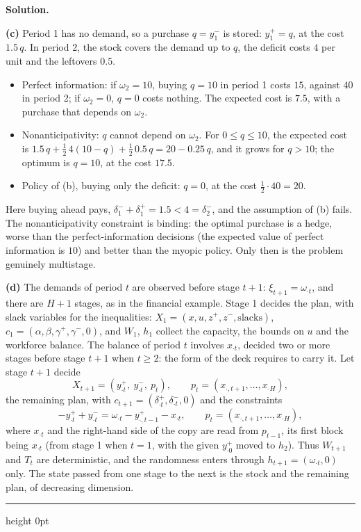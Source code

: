 \documentclass[11pt]{article}
\newenvironment{solution}
    {\par\nobreak\smallskip\noindent\textbf{Solution.}\par\nobreak\smallskip}
    {\par\medskip\hrule height 0pt\medskip}
\begin{document}
\begin{solution}
\textbf{(c)} Period 1 has no demand, so a purchase $q = y_1^-$ is stored:
$y_1^+ = q$, at the cost $1.5\,q$. In period 2, the stock covers the demand up to $q$,
the deficit costs $4$ per unit and the leftovers $0.5$.
\begin{itemize}
\item Perfect information: if $\omega_2 = 10$, buying $q = 10$ in period 1 costs
$15$, against $40$ in period 2; if $\omega_2 = 0$, $q = 0$ costs nothing. The
expected cost is $7.5$, with a purchase that depends on $\omega_2$.
\item Nonanticipativity: $q$ cannot depend on $\omega_2$. For $0 \leq q \leq 10$,
the expected cost is
$1.5\,q + \tfrac{1}{2}\, 4(10 - q) + \tfrac{1}{2}\, 0.5\,q = 20 - 0.25\,q$, and it
grows for $q > 10$; the optimum is $q = 10$, at the cost $17.5$.
\item Policy of (b), buying only the deficit: $q = 0$, at the cost
$\tfrac{1}{2} \cdot 40 = 20$.
\end{itemize}
Here buying ahead pays, $\delta_1^- + \delta_1^+ = 1.5 < 4 = \delta_2^-$, and the
assumption of (b) fails. The nonanticipativity constraint is binding: the optimal
purchase is a hedge, worse than the perfect-information decisions (the expected
value of perfect information is $10$) and better than the myopic policy. Only
then is the problem genuinely multistage.

\textbf{(d)} The demands of period $t$ are observed before stage $t + 1$:
$\xi_{t+1} = \omega_{\cdot t}$, and there are $H + 1$ stages, as in the financial
example. Stage 1 decides the plan, with slack variables for the inequalities:
$X_1 = (x, u, z^+, z^-, \text{slacks})$, $c_1 = (\alpha, \beta, \gamma^+, \gamma^-, 0)$,
and $W_1$, $h_1$ collect the capacity, the bounds on $u$ and the workforce balance.
The balance of period $t$ involves $x_{\cdot t}$, decided two or more stages before
stage $t + 1$ when $t \geq 2$: the form of the deck requires to carry it. Let stage
$t + 1$ decide
\[
X_{t+1} = \left( y_{\cdot t}^+,\ y_{\cdot t}^-,\ p_t \right),
\qquad p_t = (x_{\cdot, t+1}, \ldots, x_{\cdot H}),
\]
the remaining plan, with $c_{t+1} = (\delta_{\cdot t}^+, \delta_{\cdot t}^-, 0)$ and
the constraints
\[
-y_{\cdot t}^+ + y_{\cdot t}^- = \omega_{\cdot t} - y_{\cdot, t-1}^+ - x_{\cdot t},
\qquad p_t = (x_{\cdot, t+1}, \ldots, x_{\cdot H}),
\]
where $x_{\cdot t}$ and the right-hand side of the copy are read from $p_{t-1}$, its
first block being $x_{\cdot t}$ (from stage 1 when $t = 1$, with the given $y_{\cdot 0}^+$
moved to $h_2$). Thus $W_{t+1}$ and $T_t$ are deterministic, and the randomness
enters through $h_{t+1} = (\omega_{\cdot t}, 0)$ only. The state passed from one
stage to the next is the stock and the remaining plan, of decreasing dimension.


\end{solution}
\end{document}

